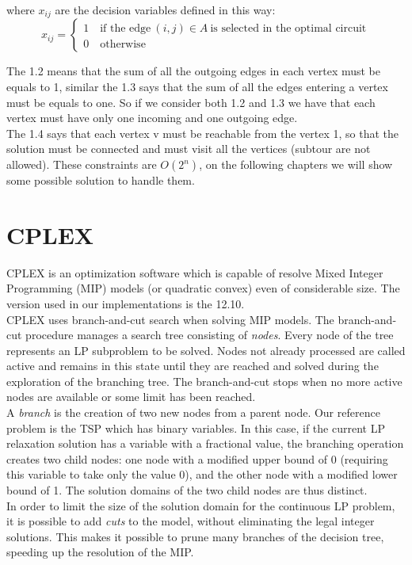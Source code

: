 where $x_{ij}$ are the decision variables defined in this way:
\[ x_{ij} =
	\begin{cases}
		1 \quad \text{if the edge} \ (i,j) \in A \ \text{is selected in the optimal circuit} \\
		0 \quad \text{otherwise}
	\end{cases}
\]

\noindent The 1.2 means that the sum of all the outgoing edges in each vertex must be equals to 1, similar the 1.3 says that the sum of all the edges entering a vertex must be equals to one. So if we consider both 1.2 and 1.3 we have that each vertex must have only one incoming and one outgoing edge. \\ The 1.4 says that each vertex v must be reachable from the vertex 1, so that the solution must be connected and must visit all the vertices (subtour are not allowed). These constraints are $O(2^n)$, on the following chapters we will show some possible solution to handle them.


\section{CPLEX}
CPLEX is an optimization software which is capable of resolve Mixed Integer Programming (MIP) models (or quadratic convex) even of considerable size. The version used in our implementations is the 12.10.\\
CPLEX uses branch-and-cut search when solving MIP models. The branch-and-cut procedure manages a search tree consisting of \textit{nodes}. Every node of the tree represents an LP subproblem to be solved. Nodes not already processed are called active and remains in this state until they are reached and solved during the exploration of the branching tree. The branch-and-cut stops when no more active nodes are available or some limit has been reached.\\
A \textit{branch} is the creation of two new nodes from a parent node. Our reference problem is the TSP which has binary variables. In this case, if the current LP relaxation solution has a variable with a fractional value, the branching operation creates two child nodes: one node with a modified upper bound of 0 (requiring this variable to take only the value 0), and the other node with a modified lower bound of 1. The solution domains of the two child nodes are thus distinct.\\
In order to limit the size of the solution domain for the continuous LP problem, it is possible to add \textit{cuts} to the model, without eliminating the legal integer solutions. This makes it possible to prune many branches of the decision tree, speeding up the resolution of the MIP.

